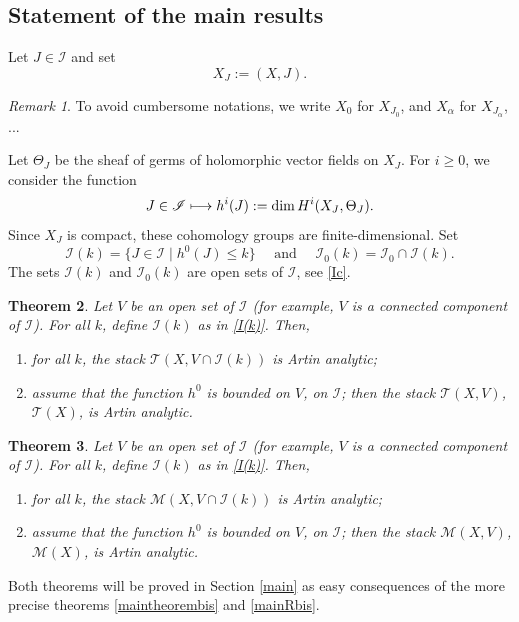 \documentclass[JEP,XML,SOM,Unicode]{cedram}
\let\mathcal\mathscr
\def\mto{\mathchoice{\longmapsto}{\mapsto}{\mapsto}{\mapsto}}
\theoremstyle{plain}
\newtheorem{theorem}{Theorem}[section]
\theoremstyle{definition}
\theoremstyle{remark}
\newtheorem{remark}[theorem]{Remark}
\numberwithin{equation}{section}
\newcommand{\T}{\mathcal T(X)}
\newcommand{\cI}{\mathcal{I}}
\begin{document}
\subsection{Statement of the main results}
\label{statements}
Let $J\in \cI$ and set
\begin{equation}
\label{XJ}
X_J:=(X,J).
\end{equation}
\begin{remark}
\label{notation}
To avoid cumbersome notations, we write $X_0$ for $X_{J_0}$, and $X_\alpha$ for $X_{J_\alpha}$, ...
\end{remark}
Let $\Theta_J$ be the sheaf of germs of holomorphic vector fields on $X_J$. For $i\geq 0$, we consider the function
\begin{equation}
\label{h(J)}
J\in\cI\mto h^i(J):=\dim H^i(X_J,\Theta_J).
\end{equation}
Since $X_J$ is compact, these cohomology groups are finite-dimensional. Set
\begin{equation}
\label{I(k)}
\cI(k)=\{J\in \cI\mid h^0(J)\leq k\}\quad\text{ and }\quad\cI_0(k)=\cI_0\cap \cI(k).
\end{equation}
The sets $\cI(k)$ and $\cI_0(k)$ are open sets of $\mathcal{I}$, see \eqref{Ic}.
\begin{theorem}
\label{maintheorem}
Let $V$ be an open set of $\cI$ (for example, $V$ is a connected component of $\cI$). For all $k$, define $\cI(k)$ as in \eqref{I(k)}. Then,
\begin{enumerate}
\item
for all $k$, the stack $\mathcal T(X,V\cap \cI(k))$ is Artin analytic;
\item
assume that the function $h^0$ is bounded on $V$, \resp on $\cI$; then the stack $\mathcal T(X,V)$, \resp $\T$, is Artin analytic.
\end{enumerate}
\end{theorem}

\begin{theorem}
\label{mainR}
Let $V$ be an open set of $\cI$ (for example, $V$ is a connected component of $\cI$). For all $k$, define $\cI(k)$ as in \eqref{I(k)}. Then,
\begin{enumerate}
\item
for all $k$, the stack $\mathcal M(X,V\cap \cI(k))$ is Artin analytic;
\item
assume that the function $h^0$ is bounded on $V$, \resp on $\cI$; then the stack $\mathcal M(X,V)$, \resp $\mathcal M(X)$, is Artin analytic.
\end{enumerate}
\end{theorem}
Both theorems will be proved in Section \ref{main} as easy consequences of the more precise theorems \ref{maintheorembis} and \ref{mainRbis}.
\end{document}
